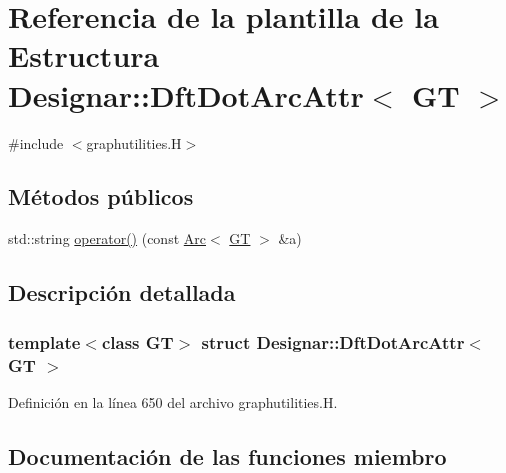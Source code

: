 \hypertarget{struct_designar_1_1_dft_dot_arc_attr}{}\section{Referencia de la plantilla de la Estructura Designar\+:\+:Dft\+Dot\+Arc\+Attr$<$ GT $>$}
\label{struct_designar_1_1_dft_dot_arc_attr}


{\ttfamily \#include $<$graphutilities.\+H$>$}

\subsection*{Métodos públicos}
\begin{DoxyCompactItemize}
\item 
std\+::string \hyperlink{struct_designar_1_1_dft_dot_arc_attr_ab98550f41b109bbd2d479355ad9de769}{operator()} (const \hyperlink{namespace_designar_a3f55fb5513d62ff47cbc8f72b8e95d6f}{Arc}$<$ \hyperlink{demo-buildgraph_8_c_a3001c40d2c31ca87ed96cd7d1334a55e}{GT} $>$ \&a)
\end{DoxyCompactItemize}


\subsection{Descripción detallada}
\subsubsection*{template$<$class GT$>$\newline
struct Designar\+::\+Dft\+Dot\+Arc\+Attr$<$ G\+T $>$}



Definición en la línea 650 del archivo graphutilities.\+H.



\subsection{Documentación de las funciones miembro}
\mbox{\label{struct_designar_1_1_dft_dot_arc_attr_ab98550f41b109bbd2d479355ad9de769}} 
